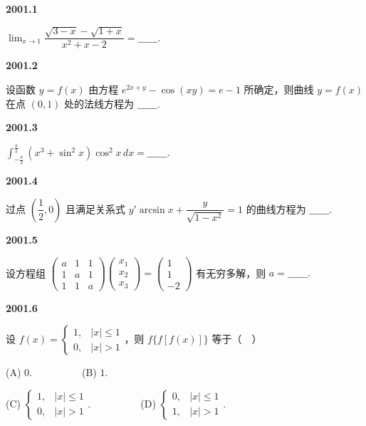 \documentclass[UTF8,12pt,fontset=windows]{ctexart}
\begin{document}
{\large\bfseries 2001.1}

$\lim_{x \to 1} \dfrac{\sqrt{3 - x} - \sqrt{1 + x}}{x^2 + x - 2} = \_\_\_\_\_\_.$

\vfill
\newpage
{\large\bfseries 2001.2}

设函数 $y = f(x)$ 由方程 $e^{2x + y} - \cos(xy) = e - 1$ 所确定，则曲线 $y = f(x)$ 在点 $(0,1)$ 处的法线方程为 $\_\_\_\_\_\_.$

\vfill
\newpage
{\large\bfseries 2001.3}

$\int_{-\frac{\pi}{2}}^{\frac{\pi}{2}} (x^3 + \sin^2 x)\cos^2 x \, dx = \_\_\_\_\_\_.$

\vfill
\newpage
{\large\bfseries 2001.4}

过点 $\left(\dfrac{1}{2}, 0\right)$ 且满足关系式 $y'\arcsin x + \dfrac{y}{\sqrt{1 - x^2}} = 1$ 的曲线方程为 $\_\_\_\_\_\_.$

\vfill
\newpage
{\large\bfseries 2001.5}

设方程组 $\begin{pmatrix} a & 1 & 1 \\ 1 & a & 1 \\ 1 & 1 & a \end{pmatrix} \begin{pmatrix} x_1 \\ x_2 \\ x_3 \end{pmatrix} = \begin{pmatrix} 1 \\ 1 \\ -2 \end{pmatrix}$ 有无穷多解，则 $a = \_\_\_\_\_\_.$

\vfill
\newpage
{\large\bfseries 2001.6}

设 $f(x) = \begin{cases} 1, & |x| \leqslant 1 \\ 0, & |x| > 1 \end{cases}$，则 $f\{f[f(x)]\}$ 等于（　）

(A) $0$.　　　　　(B) $1$.

(C) $\begin{cases} 1, & |x| \leqslant 1 \\ 0, & |x| > 1 \end{cases}$.　　　　　(D) $\begin{cases} 0, & |x| \leqslant 1 \\ 1, & |x| > 1 \end{cases}$.
\end{document}
